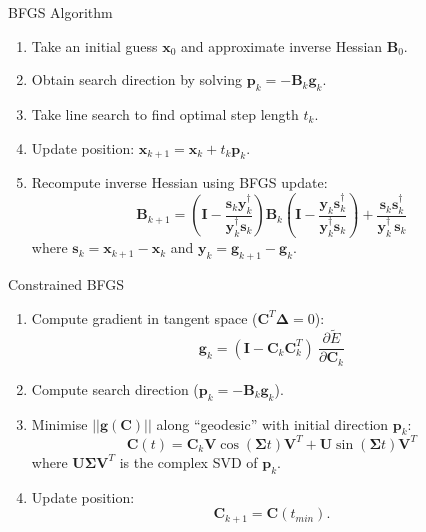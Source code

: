 \documentclass{beamer}
\def\hE{\tilde{E}}
\begin{document}
\begin{frame}{BFGS Algorithm}
\begin{enumerate}
  \item<1-> Take an initial guess $\mathbf{x}_0$ and approximate inverse Hessian $\mathbf{B}_0$.
  \item<1-> Obtain search direction by solving $\mathbf{p}_k = - \mathbf{B}_k \mathbf{g}_k.$
  \item<1-> Take line search to find optimal step length $t_k$.
  \item<1-> Update position: $\mathbf{x}_{k+1} = \mathbf{x}_{k} + t_k \mathbf{p}_{k}.$
  \item<1-> Recompute inverse Hessian using BFGS update:
  $$\mathbf{B}_{k+1} =  \left (\mathbf{I}-\frac { \mathbf{s}_k \mathbf{y}_k^{\dagger}} {\mathbf{y}_k^{\dagger} \mathbf{s}_k} \right ) \mathbf{B}_{k} \left (\mathbf{I}-\frac { \mathbf{y}_k \mathbf{s}_k^{\dagger}} {\mathbf{y}_k^{\dagger} \mathbf{s}_k} \right )+\frac
{\mathbf{s}_k \mathbf{s}_k^{\dagger}} {\mathbf{y}_k^{\dagger} \, \mathbf{s}_k}$$
where $\mathbf{s}_k = \mathbf{x}_{k+1} - \mathbf{x}_{k}$ and $\mathbf{y}_k = \mathbf{g}_{k+1} - \mathbf{g}_{k}.$
\end{enumerate}
\end{frame}

\begin{frame}{Constrained BFGS}
\begin{enumerate}
\item<1->{Compute gradient in tangent space ($\mathbf{C}^T \mathbf{\Delta} = 0$):
$$\mathbf{g}_k = (\mathbf{I} - \mathbf{C}_k \mathbf{C}_k^T)\ \frac{\partial \hE}{\partial \mathbf{C}_k}$$}
\item<1->{Compute search direction ($\mathbf{p}_k = - \mathbf{B}_k \mathbf{g}_k$).}
\item<1->{Minimise $||\mathbf{g}(\mathbf{C})||$ along ``geodesic'' with initial direction $\mathbf{p}_k$:
$$\mathbf{C}(t) = \mathbf{C}_k \mathbf{V} \cos(\mathbf{\Sigma} t)\mathbf{V}^T + \mathbf{U} \sin(\mathbf{\Sigma} t) \mathbf{V}^T$$
where $\mathbf{U \Sigma V}^T$ is the complex SVD of $\mathbf{p}_k$.}
\item<1->{Update position:
$$\mathbf{C}_{k+1} = \mathbf{C}(t_{min}).$$}
\end{enumerate}
\end{frame}
\end{document}
